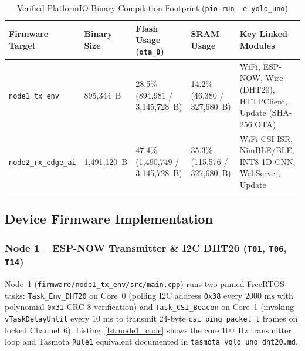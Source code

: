 \documentclass{hcmut-report}
\begin{document}
\begin{table}[H]
\centering
\caption{Verified PlatformIO Binary Compilation Footprint (\texttt{pio run -e yolo\_uno})}
\label{tab:pio_footprint}
\small
\begin{tabularx}{\textwidth}{|P{3.6cm}|R{2.4cm}|R{2.7cm}|R{2.5cm}|Y|}
\hline
\textbf{Firmware Target} & \textbf{Binary Size} & \textbf{Flash Usage (\texttt{ota\_0})} & \textbf{SRAM Usage} & \textbf{Key Linked Modules} \\
\hline
\texttt{node1\_tx\_env} & 895,344~B & 28.5\% (894,981 / 3,145,728~B) & 14.2\% (46,380 / 327,680~B) & WiFi, ESP-NOW, Wire (DHT20), HTTPClient, Update (SHA-256 OTA) \\
\hline
\texttt{node2\_rx\_edge\_ai} & 1,491,120~B & 47.4\% (1,490,749 / 3,145,728~B) & 35.3\% (115,576 / 327,680~B) & WiFi CSI ISR, NimBLE/BLE, INT8 1D-CNN, WebServer, Update \\
\hline
\end{tabularx}
\end{table}

\subsection[Device Firmware]{Device Firmware Implementation}
\label{sec:firmware}

\subsubsection[Node 1 Firmware (\texttt{node1\_tx\_env})]{Node 1 -- ESP-NOW Transmitter \& I2C DHT20 (\texttt{T01}, \texttt{T06}, \texttt{T14})}
\label{sec:fw_node1}

Node~1 (\texttt{firmware/\allowbreak node1\_tx\_env/\allowbreak src/\allowbreak main.cpp}) runs two pinned FreeRTOS tasks: \texttt{Task\_Env\_DHT20} on Core~0 (polling I2C address \texttt{0x38} every $2000\text{ ms}$ with polynomial \texttt{0x31} CRC-8 verification) and \texttt{Task\_CSI\_Beacon} on Core~1 (invoking \texttt{vTaskDelayUntil} every $10\text{ ms}$ to transmit 24-byte \texttt{csi\_ping\_packet\_t} frames on locked Channel~6). Listing~\ref{lst:node1_code} shows the core 100~Hz transmitter loop and Tasmota \texttt{Rule1} equivalent documented in \texttt{tasmota\_yolo\_uno\_dht20.md}.
\end{document}
